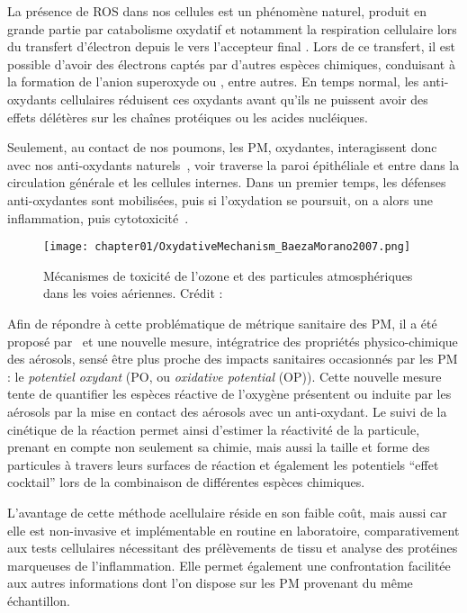 La présence de ROS dans nos cellules est un phénomène naturel, produit en grande partie
par catabolisme oxydatif et notamment la respiration cellulaire lors du transfert
d'électron depuis le  vers l'accepteur final . Lors de ce transfert, il est
possible d'avoir des électrons captés par d'autres espèces chimiques, conduisant à la
formation de l'anion superoxyde  ou , entre autres.
En temps normal, les anti-oxydants cellulaires réduisent ces oxydants avant qu'ils ne
puissent avoir des effets délétères sur les chaînes protéiques ou les acides nucléiques.

Seulement, au contact de nos poumons, les PM, oxydantes, interagissent donc avec nos
anti-oxydants naturels~\autocite{kellyProtein2003}, voir traverse la paroi épithéliale
et entre dans la circulation générale et les cellules internes.
Dans un premier temps, les défenses anti-oxydantes sont mobilisées, puis si l'oxydation se
poursuit, on a alors une inflammation, puis cytotoxicité~\autocite{baezaPollution2007}.

\begin{figure}[ht]
    \centering
    \texttt{[image: chapter01/OxydativeMechanism\_BaezaMorano2007.png]}
    \caption{Mécanismes de toxicité de l’ozone et des particules atmosphériques dans les voies
    aériennes. Crédit : \cite[figure 1]{baezaPollution2007}}%
    \label{fig:mecanisme_oxydation}
\end{figure}

Afin de répondre à cette problématique de métrique sanitaire des PM, il a été proposé
par~\cite{zielinskiModeling1999} et \cite{choRedox2005} une nouvelle mesure,
intégratrice des propriétés physico-chimique des aérosols, sensé être plus proche des
impacts sanitaires occasionnés par les PM : le \textit{potentiel oxydant} (PO, ou
\textit{oxidative potential} (OP)).
Cette nouvelle mesure tente de quantifier les espèces réactive de l'oxygène présentent
ou induite par les aérosols par la mise en contact des aérosols avec un anti-oxydant.
Le suivi de la cinétique de la réaction permet ainsi d'estimer la réactivité de la
particule, prenant en compte non seulement sa chimie, mais aussi la taille et forme des
particules à travers leurs surfaces de réaction et également les potentiels ``effet
cocktail'' lors de la combinaison de différentes espèces chimiques.

L'avantage de cette méthode acellulaire réside en son faible coût, mais aussi car elle est
non-invasive et implémentable en routine en laboratoire, comparativement aux tests
cellulaires nécessitant des prélèvements de tissu et analyse des protéines marqueuses de
l'inflammation.  Elle permet également une confrontation facilitée aux autres informations
dont l'on dispose sur les PM provenant du même échantillon.

